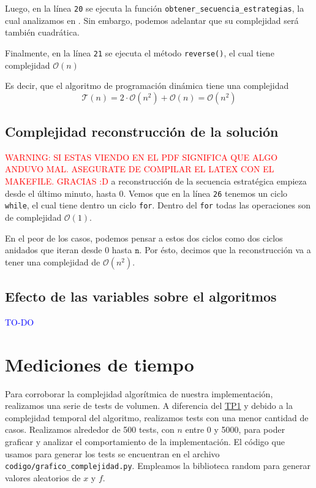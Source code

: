 \documentclass{article}
\newcommand{\funcionArchivo}[2]{%
  {\textcolor{red}{WARNING: SI ESTAS VIENDO EN EL PDF SIGNIFICA QUE ALGO ANDUVO MAL. ASEGURATE DE COMPILAR EL LATEX CON EL MAKEFILE. GRACIAS :D}}
  }%
\begin{document}
Luego, en la línea \texttt{20} se ejecuta la función \texttt{obtener\_secuencia\_estrategias}, la cual analizamos en . Sin embargo, podemos adelantar que su complejidad será también cuadrática.

Finalmente, en la línea \texttt{21} se ejecuta el método \texttt{reverse()}, el cual tiene complejidad $\mathcal{O}(n)$

Es decir, que el algoritmo de programación dinámica tiene una complejidad 
$$
\mathcal{T}(n) = 2 \cdot \mathcal{O}(n^2) + \mathcal{O}(n) = \mathcal{O}(n^2)
$$


\subsection{Complejidad reconstrucción de la solución}
\label{sec:reconstruccion}

\funcionArchivo{codigo/algoritmo.py obtener_secuencia_estrategias}
La reconstrucción de la secuencia estratégica empieza desde el último minuto, hasta 0.
Vemos que en la línea \texttt{26} tenemos un ciclo \texttt{while}, el cual tiene dentro un ciclo \texttt{for}.
Dentro del \texttt{for} todas las operaciones son de complejidad $\mathcal{O}(1)$.

En el peor de los casos, podemos pensar a estos dos ciclos como dos ciclos anidados que iteran desde 0 hasta $\texttt{n}$. Por ésto, decimos que la reconstrucción va a tener una complejidad de $\mathcal{O}(n^2)$.

\subsection{Efecto de las variables sobre el algoritmos}
\textcolor{blue}{TO-DO}
\section{Mediciones de tiempo}
\label{sec:medTiempo}
Para corroborar la complejidad algorítmica de nuestra implementación, realizamos una serie de tests de volumen. A diferencia del \href{https://github.com/La-sociedad-del-silencio/TP1-Greedy}{TP1} y debido a la complejidad temporal del algoritmo, realizamos tests con una menor cantidad de casos.
Realizamos alrededor de 500 tests, con $n$ entre 0 y 5000, para poder graficar y analizar el comportamiento de la implementación. El código que usamos para generar los tests se encuentran en el archivo \texttt{codigo/grafico\_complejidad.py}. Empleamos la biblioteca random para generar valores aleatorios de $x$ y $f$.
\end{document}
